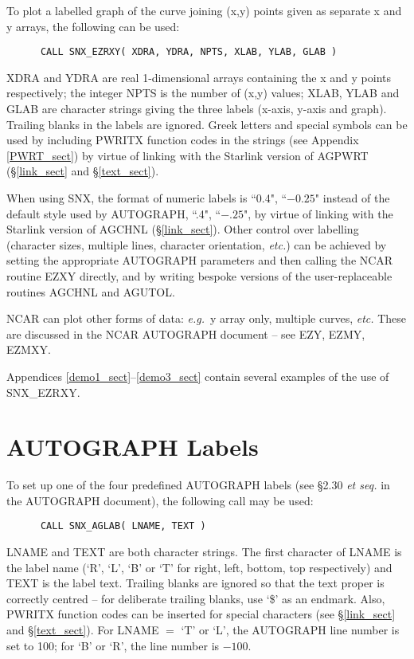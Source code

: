 To plot a labelled graph of the curve joining (x,y) points given as separate x
and y arrays, the following can be used:

\begin{verbatim}
      CALL SNX_EZRXY( XDRA, YDRA, NPTS, XLAB, YLAB, GLAB )
\end{verbatim}

XDRA and YDRA are real 1-dimensional arrays containing the x and y points
respectively; the integer NPTS is the number of (x,y) values; XLAB, YLAB and
GLAB are character strings giving the three labels (x-axis, y-axis and graph).
Trailing blanks in the labels are ignored.
Greek letters and special symbols can be used by including PWRITX function
codes in the strings (see Appendix \ref{PWRT_sect}) by virtue of linking with 
the Starlink version of AGPWRT (\S\ref{link_sect} and \S\ref{text_sect}).

When using SNX, the format of numeric labels is ``0.4", ``$-0.25$" instead of
the default style used by AUTOGRAPH, ``.4", ``$-.25$", by virtue of linking
with the Starlink version of AGCHNL (\S\ref{link_sect}).
Other control over labelling (character sizes, multiple lines, character
orientation, {\em etc.}) can be achieved by setting the appropriate AUTOGRAPH
parameters and then calling the NCAR routine EZXY directly, and by writing
bespoke versions of the user-replaceable routines AGCHNL and AGUTOL.

NCAR can plot other forms of data: {\em e.g.}\ y array only, multiple curves,
{\em etc.}
These are discussed in the NCAR AUTOGRAPH document -- see EZY, EZMY, EZMXY.

Appendices \ref{demo1_sect}--\ref{demo3_sect} contain several examples of the
use of SNX\_EZRXY.


\section {AUTOGRAPH Labels}

To set up one of the four predefined AUTOGRAPH labels (see \S 2.30 {\em et
seq.} in the AUTOGRAPH document), the following call may be used:

\begin{verbatim}
      CALL SNX_AGLAB( LNAME, TEXT )
\end{verbatim}

LNAME and TEXT are both character strings.
The first character of LNAME is the label name (`R', `L', `B' or `T' for
right, left, bottom, top respectively) and TEXT is the label text.
Trailing blanks are ignored so that the text proper is correctly centred --
for deliberate trailing blanks, use `\$' as an endmark.
Also, PWRITX function codes can be inserted for special characters (see
\S\ref{link_sect} and \S\ref{text_sect}).
For LNAME $=$ `T' or `L', the AUTOGRAPH line number is set to 100; for `B' or
`R', the line number is $-100$.


